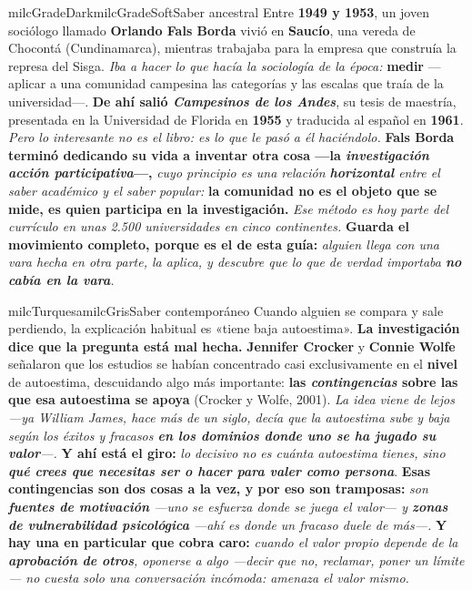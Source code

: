 \documentclass[11pt,letterpaper]{article}
\begin{document}
\begin{softbox}{milcGradeDark}{milcGradeSoft}{Saber ancestral}
Entre \textbf{1949 y 1953}, un joven sociólogo llamado \textbf{Orlando Fals Borda} vivió en \textbf{Saucío}, una vereda de Chocontá (Cundinamarca), mientras trabajaba para la empresa que construía la represa del Sisga. \emph{Iba a hacer lo que hacía la sociología de la época:} \textbf{medir} ---aplicar a una comunidad campesina las categorías y las escalas que traía de la universidad---. \textbf{De ahí salió \emph{Campesinos de los Andes}}, su tesis de maestría, presentada en la Universidad de Florida en \textbf{1955} y traducida al español en \textbf{1961}. \emph{Pero lo interesante no es el libro: es lo que le pasó a él haciéndolo.} \textbf{Fals Borda terminó dedicando su vida a inventar otra cosa ---la \emph{investigación acción participativa}---,} \emph{cuyo principio es una relación \textbf{horizontal} entre el saber académico y el saber popular:} \textbf{la comunidad no es el objeto que se mide, es quien participa en la investigación.} \emph{Ese método es hoy parte del currículo en unas 2.500 universidades en cinco continentes.} \textbf{Guarda el movimiento completo, porque es el de esta guía:} \emph{alguien llega con una vara hecha en otra parte, la aplica, y descubre que lo que de verdad importaba \textbf{no cabía en la vara}.}
\end{softbox}

\begin{softbox}{milcTurquesa}{milcGris}{Saber contemporáneo}
Cuando alguien se compara y sale perdiendo, la explicación habitual es «tiene baja autoestima». \textbf{La investigación dice que la pregunta está mal hecha.} \textbf{Jennifer Crocker} y \textbf{Connie Wolfe} señalaron que los estudios se habían concentrado casi exclusivamente en el \textbf{nivel} de autoestima, descuidando algo más importante: \textbf{las \emph{contingencias} sobre las que esa autoestima se apoya} (Crocker y Wolfe, 2001). \emph{La idea viene de lejos ---ya William James, hace más de un siglo, decía que la autoestima sube y baja según los éxitos y fracasos \textbf{en los dominios donde uno se ha jugado su valor}---.} \textbf{Y ahí está el giro:} \emph{lo decisivo no es cuánta autoestima tienes, sino \textbf{qué crees que necesitas ser o hacer para valer como persona}}. \textbf{Esas contingencias son dos cosas a la vez, y por eso son tramposas:} \emph{son \textbf{fuentes de motivación} ---uno se esfuerza donde se juega el valor--- y \textbf{zonas de vulnerabilidad psicológica} ---ahí es donde un fracaso duele de más---.} \textbf{Y hay una en particular que cobra caro:} \emph{cuando el valor propio depende de la \textbf{aprobación de otros}, oponerse a algo ---decir que no, reclamar, poner un límite--- no cuesta solo una conversación incómoda: amenaza el valor mismo.}
\end{softbox}
\end{document}
